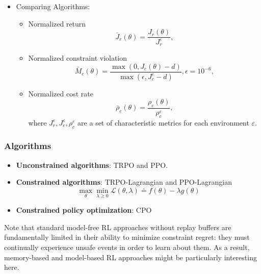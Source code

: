 \begin{itemize}
\begin{itemize}
	\end{itemize}
\item
	Comparing Algorithms: 
	\begin{itemize}
	\item
		Normalized return
		\begin{equation}
			\bar{J}_r(\theta) = \frac{J_r(\theta)}{J_r^{\varepsilon}},
		\end{equation}
	\item
		Normalized constraint violation
		\begin{equation}
			\bar{M}_c(\theta) = \frac{\max(0, J_c(\theta) - d)}{\max(\epsilon, J_c^{\varepsilon} - d)}, \epsilon = 10^{-6},
		\end{equation}
	\item
		Normalized cost rate
		\begin{equation}
			\bar{\rho}_c(\theta) = \frac{\rho_c(\theta)}{\rho_c^{\varepsilon}},
		\end{equation}
		where $J_r^{\varepsilon}, J_c^{\varepsilon}, \rho_c^{\varepsilon}$ are a set of characteristic metrics for each environment ${\varepsilon}$.
	\end{itemize}
\end{itemize}
         
%
\subsubsection{Algorithms}
\begin{itemize}
\item
	\textbf{Unconstrained algorithms}: TRPO\citep{Schulman_2015} and PPO\citep{Schulman_2017}.
\item
	\textbf{Constrained algorithms}: TRPO-Lagrangian and PPO-Lagrangian
	\begin{equation}
		\max_{\theta}\min_{\lambda \geq 0} \mathcal{L}(\theta, \lambda) \doteq f(\theta) - \lambda g(\theta)
	\end{equation}
\item
	\textbf{Constrained policy optimization}: CPO \citep{Achiam_2017, Chow_2019}
\end{itemize}

Note that standard model-free RL approaches without replay buffers are fundamentally limited in their ability to minimize constraint regret: they must continually experience unsafe events in order to learn about them. As a result, memory-based and model-based RL approaches might be particularly interesting here.\\

